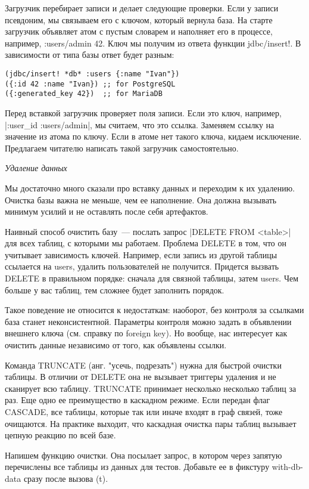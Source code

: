 Загрузчик перебирает записи и делает следующие проверки. Если у записи
псевдоним, мы связываем его с ключом, который вернула база. На старте загрузчик
объявляет атом с пустым словарем и наполняет его в процессе, например,
{:users/admin 42}. Ключ мы получим из ответа функции jdbc/insert!. В зависимости
от типа базы ответ будет разным:

\begin{verbatim}
(jdbc/insert! *db* :users {:name "Ivan"})
({:id 42 :name "Ivan}) ;; for PostgreSQL
({:generated_key 42})  ;; for MariaDB
\end{verbatim}

Перед вставкой загрузчик проверяет поля записи. Если это ключ, например,
\spverb|{:user_id :users/admin}|, мы считаем, что это ссылка. Заменяем ссылку на значение
из атома по ключу. Если в атоме нет такого ключа, кидаем исключение. Предлагаем
читателю написать такой загрузчик самостоятельно.

\emph{Удаление данных}

Мы достаточно много сказали про вставку данных и переходим к их
удалению. Очистка базы важна не меньше, чем ее наполнение. Она должна вызывать
минимум усилий и не оставлять после себя артефактов.

Наивный способ очистить базу~--- послать запрос \spverb|DELETE FROM <table>| для всех
таблиц, с которыми мы работаем. Проблема DELETE в том, что он учитывает
зависимость ключей. Например, если запись из другой таблицы ссылается на users,
удалить пользователей не получится. Придется вызвать DELETE в правильном
порядке: сначала для связной таблицы, затем users. Чем больше у вас таблиц, тем
сложнее будет заполнить порядок.

Такое поведение не относится к недостаткам: наоборот, без контроля за ссылками
база станет неконсистентной. Параметры контроля можно задать в объявлении
внешнего ключа (см. справку по foreign key). Но вообще, нас интересует как
очистить данные независимо от того, как объявлены ссылки.

Команда TRUNCATE (анг. "усечь, подрезать") нужна для быстрой очистки таблицы. В
отличии от DELETE она не вызывает триггеры удаления и не сканирует всю
таблицу. TRUNCATE принимает несколько несколько таблиц за раз. Еще одно ее
преимущество в каскадном режиме. Если передан флаг CASCADE, все таблицы, которые
так или иначе входят в граф связей, тоже очищаются. На практике выходит, что
каскадная очистка пары таблиц вызывает цепную реакцию по всей базе.

Напишем функцию очистки. Она посылает запрос, в котором через запятую
перечислены все таблицы из данных для тестов. Добавьте ее в фикстуру
with-db-data сразу после вызова (t).

